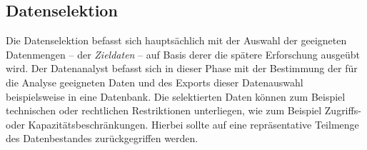 \subsection{Datenselektion}
Die Datenselektion befasst sich hauptsächlich mit der Auswahl der geeigneten Datenmengen -- der \textit{Zieldaten} -- auf Basis derer die spätere Erforschung ausgeübt wird. Der Datenanalyst befasst sich in dieser Phase mit der Bestimmung der für die Analyse geeigneten Daten und des Exports dieser Datenauswahl beispielsweise in eine Datenbank. Die selektierten Daten können zum Beispiel technischen oder rechtlichen Restriktionen unterliegen, wie zum Beispiel Zugriffs- oder Kapazitätsbeschränkungen. Hierbei sollte auf eine repräsentative Teilmenge des Datenbestandes zurückgegriffen werden.